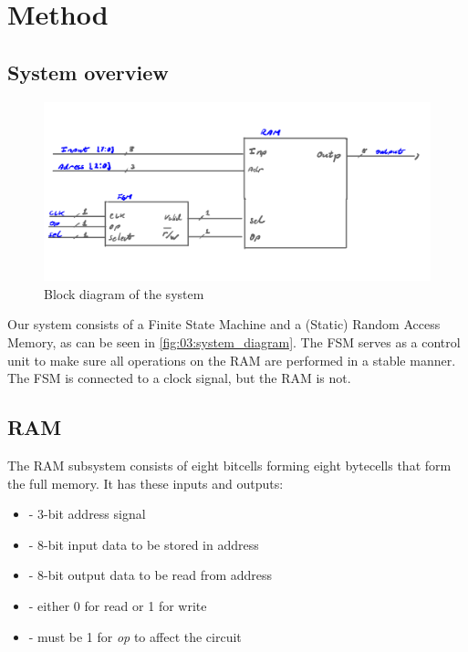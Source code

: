 \section{Method}    \label{sec:03:method}
\subsection{System overview}

\begin{figure}[hb]
    \centering
    \includegraphics[width=0.8\linewidth]{LaTeX_2/Figures/memory_block_schematic.png}
    \caption{Block diagram of the system}
    \label{fig:03:system_diagram}
\end{figure}

Our system consists of a Finite State Machine and a (Static) Random Access Memory, as can be seen in \autoref{fig:03:system_diagram}. The FSM serves as a control unit to make sure all operations on the RAM are performed in a stable manner. The FSM is connected to a clock signal, but the RAM is not.

\subsection{RAM}
The RAM subsystem consists of eight bitcells forming eight bytecells that form the full memory. It has these inputs and outputs:
\begin{itemize}
    \item {} - 3-bit address signal
    \item {} - 8-bit input data to be stored in address
    \item {} - 8-bit output data to be read from address
    \item {} - either 0 for read or 1 for write
    \item {} - must be 1 for \textit{op} to affect the circuit
\end{itemize}


